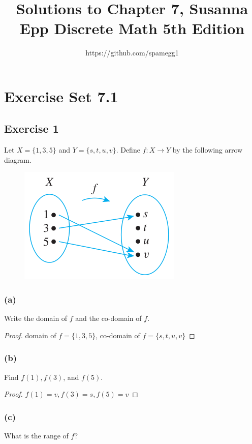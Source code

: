 \documentclass[14pt]{extarticle}
\title{Solutions to Chapter 7, Susanna Epp Discrete Math 5th Edition}
\author{https://github.com/spamegg1}
\begin{document}
\maketitle
\tableofcontents

\section{Exercise Set 7.1}

\subsection{Exercise 1}
Let \(X = \{1, 3, 5\}\) and \(Y = \{s, t, u, v\}\). Define \(f: X \to Y\) by the following arrow diagram.

\begin{figure}[ht!]
\centering
\includegraphics[scale=0.5]{../images/7.1.1.png}
\end{figure}

\subsubsection{(a)}
Write the domain of $f$ and the co-domain of $f$.

\begin{proof}
domain of \(f = \{1, 3, 5\}\), co-domain of \(f = \{s, t, u, v\}\)
\end{proof}

\subsubsection{(b)}
Find $f(1), f(3)$, and $f(5)$.

\begin{proof}
\(f(1) = v, f(3) = s, f(5) = v\)
\end{proof}

\subsubsection{(c)}
What is the range of $f$?
\end{document}
